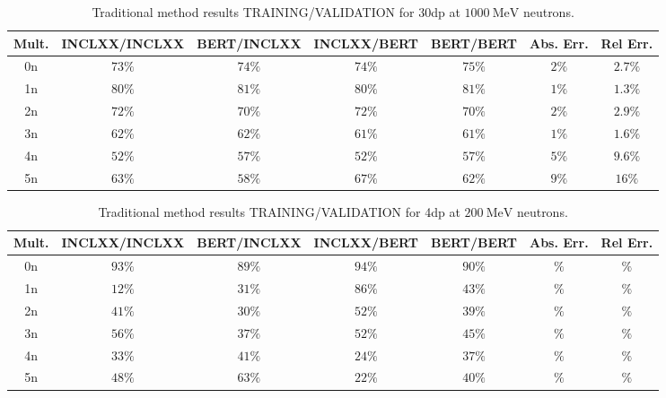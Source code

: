 \documentclass[10pt,a4paper]{report}
\newcommand{\MeV}[0]{\ \textrm{MeV}}
\begin{document}
\begin{table}[htbp] 
\centering
\caption{Traditional method results TRAINING/VALIDATION for \textrm{30dp} at ${1000 \MeV}$ neutrons.}
\label{tab:30dp1000}
\begin{tabular}{| c | c c c c | c c |} 
\hline
Mult. & INCLXX/INCLXX & BERT/INCLXX & INCLXX/BERT & BERT/BERT & Abs. Err. & Rel Err.   \\
\hline
0n    & ${73 \%}$     & ${74 \%}$   & ${74 \%}$   & ${75 \%}$ & ${2 \%}$  & ${2.7 \%}$ \\
1n    & ${80 \%}$     & ${81 \%}$   & ${80 \%}$   & ${81 \%}$ & ${1 \%}$  & ${1.3 \%}$ \\
2n    & ${72 \%}$     & ${70 \%}$   & ${72 \%}$   & ${70 \%}$ & ${2 \%}$  & ${2.9 \%}$ \\
3n    & ${62 \%}$     & ${62 \%}$   & ${61 \%}$   & ${61 \%}$ & ${1 \%}$  & ${1.6 \%}$ \\
4n    & ${52 \%}$     & ${57 \%}$   & ${52 \%}$   & ${57 \%}$ & ${5 \%}$  & ${9.6 \%}$ \\
5n    & ${63 \%}$     & ${58 \%}$   & ${67 \%}$   & ${62 \%}$ & ${9 \%}$  & ${16 \%}$  \\
\hline
\end{tabular}
\end{table}


\begin{table}[htbp] 
\centering
\caption{Traditional method results TRAINING/VALIDATION for \textrm{4dp} at ${200 \MeV}$ neutrons.}
\label{tab:4dp200}
\begin{tabular}{| c | c c c c | c c |} 
\hline
Mult. & INCLXX/INCLXX & BERT/INCLXX & INCLXX/BERT & BERT/BERT & Abs. Err. & Rel Err.   \\
\hline
0n    & ${93 \%}$     & ${89 \%}$   & ${94 \%}$   & ${90 \%}$ & ${ \%}$  & ${ \%}$ \\
1n    & ${12 \%}$     & ${31 \%}$   & ${86 \%}$   & ${43 \%}$ & ${ \%}$  & ${ \%}$ \\
2n    & ${41 \%}$     & ${30 \%}$   & ${52 \%}$   & ${39 \%}$ & ${ \%}$  & ${ \%}$ \\
3n    & ${56 \%}$     & ${37 \%}$   & ${52 \%}$   & ${45 \%}$ & ${ \%}$  & ${ \%}$ \\
4n    & ${33 \%}$     & ${41 \%}$   & ${24 \%}$   & ${37 \%}$ & ${ \%}$  & ${ \%}$ \\
5n    & ${48 \%}$     & ${63 \%}$   & ${22 \%}$   & ${40 \%}$ & ${ \%}$  & ${ \%}$  \\
\hline
\end{tabular}
\end{table}
\end{document}

